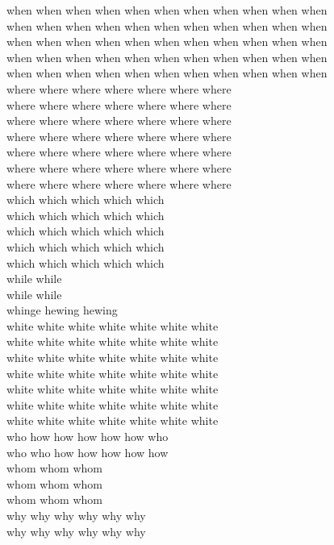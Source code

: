 when when when when when when when when when when when\\
when when when when when when when when when when when\\
when when when when when when when when when when when\\
when when when when when when when when when when when\\
when when when when when when when when when when when\\
where where where where where where where\\
where where where where where where where\\
where where where where where where where\\
where where where where where where where\\
where where where where where where where\\
where where where where where where where\\
where where where where where where where\\
which which which which which\\
which which which which which\\
which which which which which\\
which which which which which\\
which which which which which\\
while while\\
while while\\
whinge hewing hewing\\
white white white white white white white\\
white white white white white white white\\
white white white white white white white\\
white white white white white white white\\
white white white white white white white\\
white white white white white white white\\
white white white white white white white\\
who how how how how how who\\
who who how how how how how\\
whom whom whom\\
whom whom whom\\
whom whom whom\\
why why why why why why\\
why why why why why why\\
